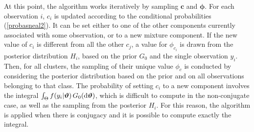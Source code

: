 At this point, the algorithm works iteratively by sampling $\boldsymbol c$ and $\boldsymbol\phi$.
For each observation $i$, $c_i$ is updated according to the conditional probabilities (\ref{probasneal2}).
It can be set either to one of the other components currently associated with some observation, or to a new mixture component.
If the new value of $c_i$ is different from all the other $c_j$, a value for $\phi_{c_i}$ is drawn from the posterior distribution $H_i$, based on the prior $G_0$ and the single observation $y_i$.
Then, for all clusters, the sampling of their unique value $\phi_c$ is conducted by considering the posterior distribution based on the prior and on all observations belonging to that class.
The probability of setting $c_i$ to a new component involves the integral $\int_{\Theta} f(y_{i}|\boldsymbol{\vartheta}) \, G_0(\mathrm d\boldsymbol{\vartheta})$, which is difficult to compute in the non-conjugate case, as well as the sampling from the posterior $H_i$.
For this reason, the algorithm is applied when there is conjugacy and it is possible to compute exactly the integral.

